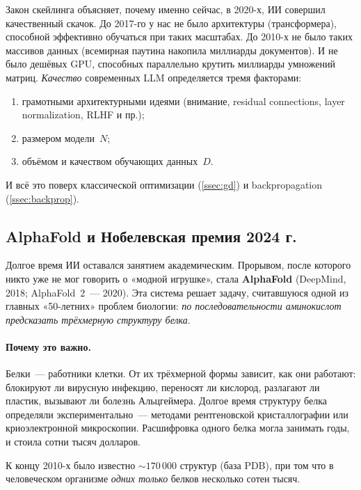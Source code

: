 \begin{notebox}[title={Откуда взялись миллиарды параметров}]
Закон скейлинга объясняет, почему именно сейчас, в 2020-х, ИИ совершил
качественный скачок. До 2017-го у нас не было архитектуры
(трансформера), способной эффективно обучаться при таких масштабах.
До 2010-х не было таких массивов данных (всемирная паутина накопила
миллиарды документов). И не было дешёвых GPU, способных параллельно
крутить миллиарды умножений матриц. \emph{Качество} современных LLM
определяется тремя факторами:
\begin{enumerate}\itemsep0pt
  \item грамотными архитектурными идеями (внимание, residual connections,
        layer normalization, RLHF и пр.);
  \item размером модели~$N$;
  \item объёмом и качеством обучающих данных~$D$.
\end{enumerate}
И всё это поверх классической оптимизации (\cref{ssec:gd}) и
backpropagation (\cref{ssec:backprop}).
\end{notebox}

\subsection{AlphaFold и Нобелевская премия 2024 г.}
\label{ssec:alphafold}

Долгое время ИИ оставался занятием академическим. Прорывом, после
которого никто уже не мог говорить о «модной игрушке», стала
\textbf{AlphaFold} (DeepMind, 2018; AlphaFold~2~--- 2020). Эта
система решает задачу, считавшуюся одной из главных «50-летних»
проблем биологии: \emph{по последовательности аминокислот предсказать
трёхмерную структуру белка}.

\paragraph{Почему это важно.}
Белки~--- работники клетки. От их трёхмерной формы зависит, как они
работают: блокируют ли вирусную инфекцию, переносят ли кислород,
разлагают ли пластик, вызывают ли болезнь Альцгеймера. Долгое время
структуру белка определяли экспериментально~--- методами рентгеновской
кристаллографии или криоэлектронной микроскопии. Расшифровка одного
белка могла занимать годы, и стоила сотни тысяч долларов.

К концу 2010-х было известно $\sim 170\,000$ структур (база PDB), при
том что в человеческом организме \emph{одних только} белков несколько
сотен тысяч.


